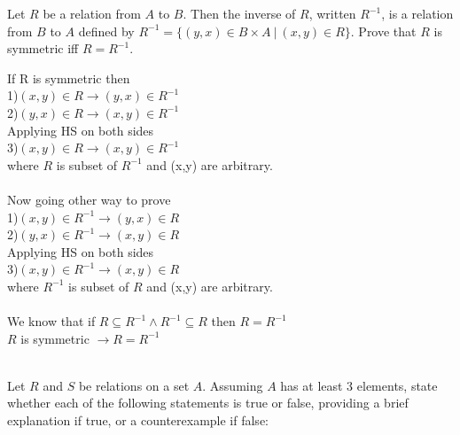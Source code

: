 \documentclass[addpoints]{exam}
\begin{document}
\begin{questions}
\question Let $R$ be a relation from $A$ to $B$. Then the inverse of $R$, written $R^{-1}$, is a relation from $B$ to $A$ defined by $R^{-1} = \{(y,x) \in B \times A \:|\: (x,y) \in R\}$. Prove that $R$ is symmetric iff $R = R^{-1}$.

  \begin{solution}
    If R is symmetric then\\
    1)$(x,y) \in R \rightarrow (y,x) \in R^{-1}$\\
    2)$(y,x) \in R \rightarrow (x,y) \in R^{-1}$\\
    Applying HS on both sides\\
    3)$(x,y) \in R \rightarrow (x,y) \in R^{-1}$\\
    where $R$ is subset of $R^{-1}$ and (x,y) are arbitrary.\\
    \\
    Now going other way to prove\\
    1)$(x,y) \in R^{-1} \rightarrow (y,x) \in R$\\
    2)$(y,x) \in R^{-1} \rightarrow (x,y) \in R$\\
    Applying HS on both sides\\
    3)$(x,y) \in R^{-1} \rightarrow (x,y) \in R$\\
    where $R^{-1}$ is subset of $R$ and (x,y) are arbitrary.\\
    \\
    We know that if $R \subseteq  R^{-1}  \wedge R^{-1} \subseteq R $ then $R = R^{-1}$ \\
    $R$ is symmetric $\rightarrow R=R^{-1}$ \\
    \\
  \end{solution}

\question Let $R$ and $S$ be relations on a set $A$. Assuming $A$ has at least 3 elements, state whether each of the following statements is true or false, providing a brief explanation if true, or a counterexample if false:
\end{questions}
\end{document}
